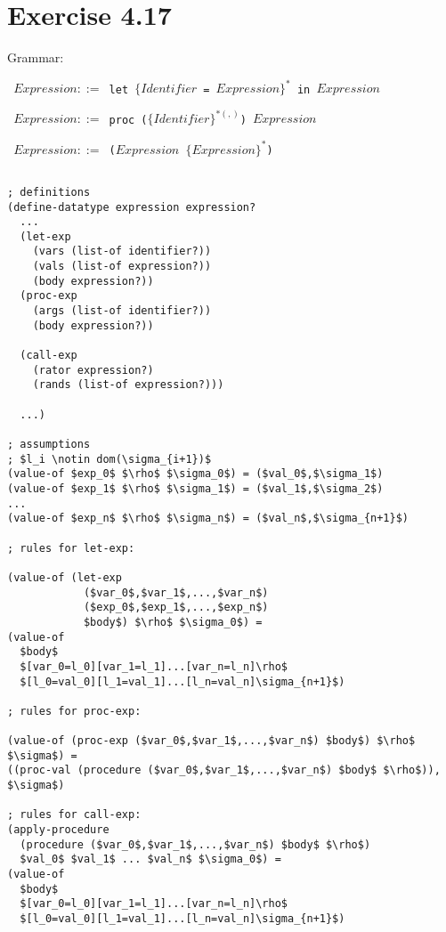 \section*{Exercise 4.17}

Grammar:

\texttt{
    $Expression ::= $ let $\{Identifier$ = $Expression\}^*$ in $Expression$
}

\texttt{
    $Expression ::= $ proc ($\{Identifier\}^{*(,)}$) $Expression$
}

\texttt{
    $Expression ::= $ ($Expression$  $\{Expression\}^{*}$) 
}

\begin{center}
\begin{lstlisting}[mathescape]

; definitions
(define-datatype expression expression?
  ...
  (let-exp
    (vars (list-of identifier?))
    (vals (list-of expression?))
    (body expression?))
  (proc-exp
    (args (list-of identifier?))
    (body expression?))
  
  (call-exp
    (rator expression?)
    (rands (list-of expression?)))
  
  ...)

; assumptions
; $l_i \notin dom(\sigma_{i+1})$
(value-of $exp_0$ $\rho$ $\sigma_0$) = ($val_0$,$\sigma_1$)
(value-of $exp_1$ $\rho$ $\sigma_1$) = ($val_1$,$\sigma_2$)
...
(value-of $exp_n$ $\rho$ $\sigma_n$) = ($val_n$,$\sigma_{n+1}$)

; rules for let-exp:

(value-of (let-exp
            ($var_0$,$var_1$,...,$var_n$)
            ($exp_0$,$exp_1$,...,$exp_n$)
            $body$) $\rho$ $\sigma_0$) =
(value-of
  $body$
  $[var_0=l_0][var_1=l_1]...[var_n=l_n]\rho$
  $[l_0=val_0][l_1=val_1]...[l_n=val_n]\sigma_{n+1}$)

; rules for proc-exp:

(value-of (proc-exp ($var_0$,$var_1$,...,$var_n$) $body$) $\rho$ $\sigma$) =
((proc-val (procedure ($var_0$,$var_1$,...,$var_n$) $body$ $\rho$)), $\sigma$)

; rules for call-exp:
(apply-procedure
  (procedure ($var_0$,$var_1$,...,$var_n$) $body$ $\rho$)
  $val_0$ $val_1$ ... $val_n$ $\sigma_0$) = 
(value-of
  $body$
  $[var_0=l_0][var_1=l_1]...[var_n=l_n]\rho$
  $[l_0=val_0][l_1=val_1]...[l_n=val_n]\sigma_{n+1}$)

\end{lstlisting}
\end{center}
